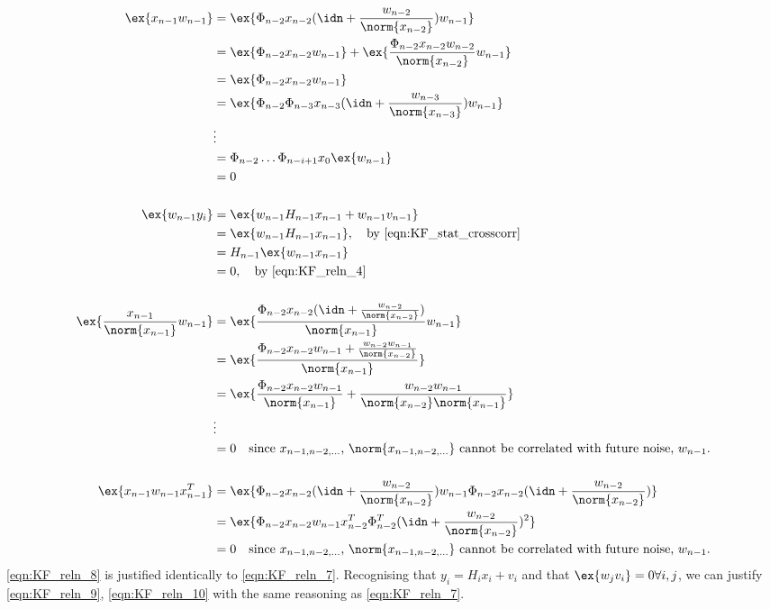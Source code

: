 \begin{align}
\ex{x_{n-1} w_{n-1}} & = \ex{\Phi_{n-2}x_{n-2}(\idn + \frac{w_{n-2}}{\norm{x_{n-2}}}) w_{n-1}} \\
& = \ex{\Phi_{n-2}x_{n-2}w_{n-1}} +\ex{ \frac{\Phi_{n-2}x_{n-2} w_{n-2}}{\norm{x_{n-2}}} w_{n-1}} \\
& = \ex{\Phi_{n-2}x_{n-2}w_{n-1}} \\
& = \ex{\Phi_{n-2}\Phi_{n-3}x_{n-3}(\idn + \frac{w_{n-3}}{\norm{x_{n-3}}})w_{n-1}} \\
& \vdots \\
& = \Phi_{n-2}\dots\Phi_{n-i+1}x_0\ex{w_{n-1}} \\
&= 0 \\
\nonumber \\ 
\ex{w_{n-1} y_i} &= \ex{w_{n-1}  H_{n-1} x_{n-1} + w_{n-1}v_{n-1}}  \\
 &= \ex{w_{n-1}  H_{n-1} x_{n-1}}, \quad\text{by \ref{eqn:KF_stat_crosscorr} } \\ 
 &= H_{n-1} \ex{w_{n-1} x_{n-1}} \\
 &= 0, \quad\text{by \ref{eqn:KF_reln_4}} \\
\nonumber \\ 
\ex{\frac{x_{n-1}}{\norm{x_{n-1}}}w_{n-1}} & = \ex{\frac{\Phi_{n-2}x_{n-2}(\idn + \frac{w_{n-2}}{\norm{x_{n-2}}})}{\norm{x_{n-1}}}w_{n-1}} \\
& = \ex{\frac{\Phi_{n-2}x_{n-2}w_{n-1} + \frac{w_{n-2}w_{n-1}}{\norm{x_{n-2}}}}{\norm{x_{n-1}}}} \\
& = \ex{\frac{\Phi_{n-2}x_{n-2}w_{n-1}}{\norm{x_{n-1}}} + \frac{w_{n-2}w_{n-1}}{\norm{x_{n-2}}\norm{x_{n-1}}}} \\
&\vdots \\
&= 0 \quad \text{since $x_{n-1, n-2, \dots}$, $\norm{x_{n-1,n-2, \dots}}$ cannot be correlated with future  noise, $w_{n-1}$.}\\
\nonumber \\ 
\ex{x_{n-1} w_{n-1} x_{n-1}^T} &= \ex{\Phi_{n-2}x_{n-2}(\idn + \frac{w_{n-2}}{\norm{x_{n-2}}}) w_{n-1} \Phi_{n-2}x_{n-2}(\idn + \frac{w_{n-2}}{\norm{x_{n-2}}})} \\
&= \ex{\Phi_{n-2}x_{n-2} w_{n-1} x_{n-2}^T\Phi_{n-2}^T(\idn + \frac{w_{n-2}}{\norm{x_{n-2}}})^2} \\
&= 0 \quad \text{since $x_{n-1, n-2, \dots}$, $\norm{x_{n-1,n-2, \dots}}$ cannot be correlated with future  noise, $w_{n-1}$.}
\end{align}
\ref{eqn:KF_reln_8} is justified identically to \ref{eqn:KF_reln_7}. Recognising that $y_i = H_i x_i + v_i$ and that $\ex{w_jv_i} = 0 \forall i,j$, we can justify \ref{eqn:KF_reln_9}, \ref{eqn:KF_reln_10} with the same reasoning as \ref{eqn:KF_reln_7}.
